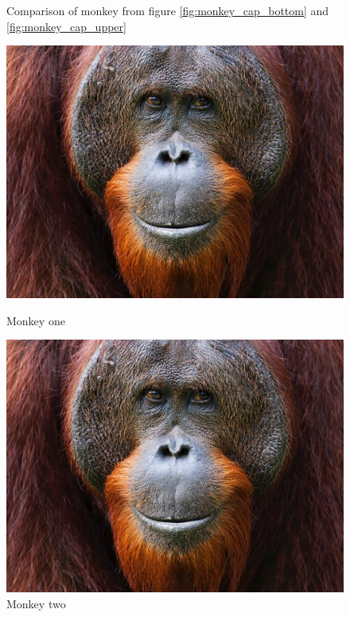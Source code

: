 \documentclass[a4paper]{report}
\begin{document}
        \begin{figure}[h]
            \caption{Comparison of monkey from figure \ref{fig:monkey_cap_bottom} and \ref{fig:monkey_cap_upper}}
            \centering
            \label{fig:comparison_of_monkeys}
            \begin{minipage}[b]{0.4\textwidth}
                \includegraphics[width=\textwidth]{abe.jpg}
                \caption{Monkey one}
              \end{minipage}
              \hfill
              \begin{minipage}[b]{0.4\textwidth}
                \includegraphics[width=\textwidth]{abe.jpg}
                \caption{Monkey two}
              \end{minipage}
        \end{figure}
\end{document}
